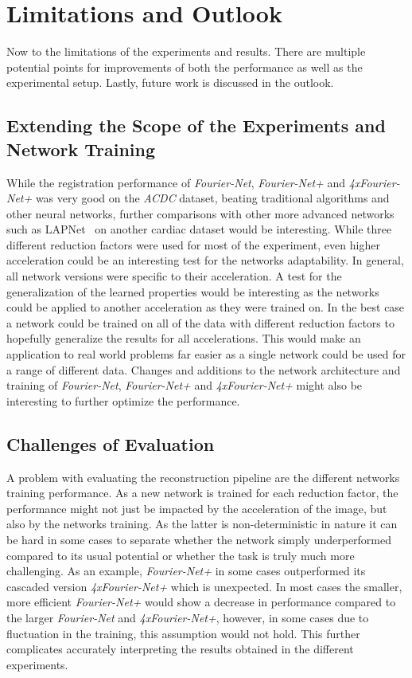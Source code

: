 \section{Limitations and Outlook} \label{Sec:LimitationsOutlook}
Now to the limitations of the experiments and results. There are multiple potential points for improvements of both the performance as well as the experimental setup. Lastly, future work is discussed in the outlook.

\subsection{Extending the Scope of the Experiments and Network Training} \label{SubSec:ExtendingScopeExperimentsNetworkTraining}
While the registration performance of \emph{Fourier-Net}, \emph{Fourier-Net+} and \emph{4xFourier-Net+} was very good on the \emph{ACDC} dataset, beating traditional algorithms and other neural networks, further comparisons with other more advanced networks such as LAPNet~\cite{LAPNet} on another cardiac dataset would be interesting. While three different reduction factors were used for most of the experiment, even higher acceleration could be an interesting test for the networks adaptability. In general, all network versions were specific to their acceleration. A test for the generalization of the learned properties would be interesting as the networks could be applied to another acceleration as they were trained on. In the best case a network could be trained on all of the data with different reduction factors to hopefully generalize the results for all accelerations. This would make an application to real world problems far easier as a single network could be used for a range of different data. Changes and additions to the network architecture and training of \emph{Fourier-Net}, \emph{Fourier-Net+} and \emph{4xFourier-Net+} might also be interesting to further optimize the performance.

\subsection{Challenges of Evaluation} \label{SubSec:ChallengesEvaluation}
A problem with evaluating the reconstruction pipeline are the different networks training performance. As a new network is trained for each reduction factor, the performance might not just be impacted by the acceleration of the image, but also by the networks training. As the latter is non-deterministic in nature it can be hard in some cases to separate whether the network simply underperformed compared to its usual potential or whether the task is truly much more challenging. As an example, \emph{Fourier-Net+} in some cases outperformed its cascaded version \emph{4xFourier-Net+} which is unexpected. In most cases the smaller, more efficient \emph{Fourier-Net+} would show a decrease in performance compared to the larger \emph{Fourier-Net} and \emph{4xFourier-Net+}, however, in some cases due to fluctuation in the training, this assumption would not hold. This further complicates accurately interpreting the results obtained in the different experiments.

